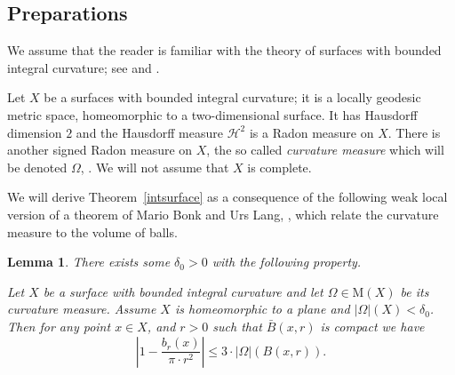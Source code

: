 \documentclass[12pt,leqno,intlimits]{amsart}
\numberwithin{equation}{section}
\newtheorem{lem}[thm]{Lemma}
\theoremstyle{definition}
\theoremstyle{remark}
\newcommand{\tref}[1]{Theorem~\ref{#1}}
\begin{document}
\subsection{Preparations}
We assume that the reader is familiar with the theory of surfaces with bounded integral curvature; see \cite{AZ} and \cite{Reshetnyak-GeomIV}.

Let $X$ be a surfaces with bounded integral curvature;
it is a locally geodesic metric space, homeomorphic to a two-dimensional surface.
It has Hausdorff dimension $2$ and the Hausdorff measure $\mathcal H^2$ is a Radon measure on $X$. There is another signed Radon measure on $X$, the so called \emph{curvature measure} which will be denoted $\Omega$, \cite[Section 8]{Reshetnyak-GeomIV}.
We will not assume that $X$ is complete.

We will derive \tref{intsurface} as a consequence of the following weak local
version of a theorem of Mario Bonk and Urs Lang, \cite{Bonk-Lang}, which relate the curvature measure to the volume of balls.


\begin{lem} \label{lem:bl}
There exists some $\delta _0>0$ with the following property.

 Let $X$ be a surface with bounded integral curvature and let $\Omega\in \mathrm M(X)$ be its curvature measure.
Assume $X$ is homeomorphic to a plane and $| \Omega|(X) < \delta _0$.
Then for any point $x\in X$, and $r>0$ such that
$\bar B (x,{r})$ is compact we have
$$\left|1- \frac {b_r(x)} {\pi{\cdot}r^2} \right| \leq 3 \cdot |\Omega |( B (x,{r})).$$
\end{lem}
\end{document}
